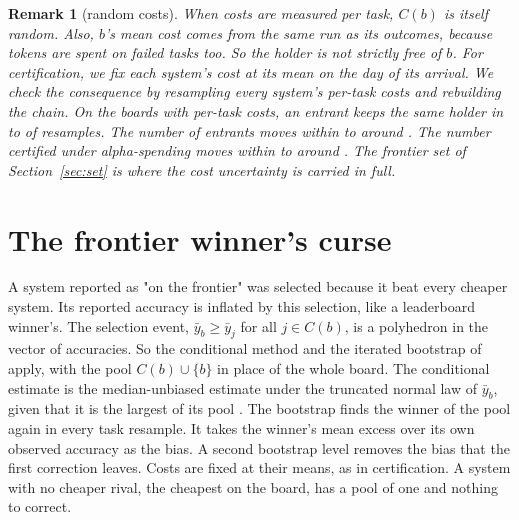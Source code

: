 \documentclass[11pt]{article}
\newtheorem{remark}{Remark}
\begin{document}
\begin{remark}[random costs]
When costs are measured per task, $C(b)$ is itself random. Also, $b$'s mean cost comes from the same run as its outcomes, because tokens are spent on failed tasks too. So the holder is not strictly free of $b$. For certification, we fix each system's cost at its mean on the day of its arrival. We check the consequence by resampling every system's per-task costs and rebuilding the chain. On the boards with per-task costs, an entrant keeps the same holder in \NumCertJitterStableMin{} to \NumCertJitterStableMax{} of \NumCertJitterR{} resamples. The number of entrants moves within \NumCertJitterEntrantsMin{} to \NumCertJitterEntrantsMax{} around \NumCertJitterEntrantsBase{}. The number certified under alpha-spending moves within \NumCertJitterSpendingMin{} to \NumCertJitterSpendingMax{} around \NumCertJitterSpendingBase{}. The frontier set of Section~\ref{sec:set} is where the cost uncertainty is carried in full.
\end{remark}

\section{The frontier winner's curse}
\label{app:curse}
A system reported as "on the frontier" was selected because it beat every cheaper system. Its reported accuracy is inflated by this selection, like a leaderboard winner's. The selection event, $\bar y_b\ge\bar y_j$ for all $j\in C(b)$, is a polyhedron in the vector of accuracies. So the conditional method and the iterated bootstrap of \citet{opoku2026records} apply, with the pool $C(b)\cup\{b\}$ in place of the whole board. The conditional estimate is the median-unbiased estimate under the truncated normal law of $\bar y_b$, given that it is the largest of its pool \citep{lee2016exact,andrews2024winners}. The bootstrap finds the winner of the pool again in every task resample. It takes the winner's mean excess over its own observed accuracy as the bias. A second bootstrap level removes the bias that the first correction leaves. Costs are fixed at their means, as in certification. A system with no cheaper rival, the cheapest on the board, has a pool of one and nothing to correct.

\begin{table}[!tbp]
\centering\small
\resizebox{\textwidth}{!}{}
\caption{The frontier winner's curse when the true values are known. Each scenario has \NumCurseValR{} boards, and every frontier member with at least one cheaper rival is included. Winners: the number of such members over the \NumCurseValR{} boards. Pool: the mean number of systems that cost no more. Bias: the mean of estimate minus true accuracy, in points, with its Monte Carlo standard error. Coverage: the share of 95\% intervals that contain the true accuracy.}
\label{tab:valcurse}
\end{table}
\end{document}
